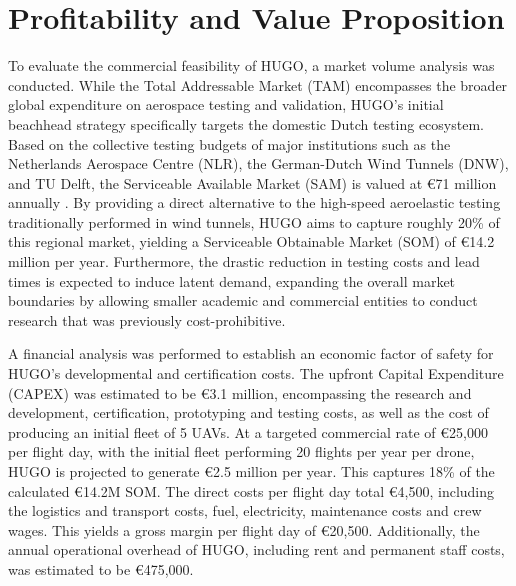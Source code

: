 


\section*{Profitability and Value Proposition}
\label{sec:exec-objective_and_value_poposition}

To evaluate the commercial feasibility of HUGO, a market volume analysis was conducted. While the Total Addressable Market (TAM) encompasses the broader global expenditure on aerospace testing and validation, HUGO's initial beachhead strategy specifically targets the domestic Dutch testing ecosystem. Based on the collective testing budgets of major institutions such as the Netherlands Aerospace Centre (NLR), the German-Dutch Wind Tunnels (DNW), and TU Delft, the Serviceable Available Market (SAM) is valued at €71 million annually . By providing a direct alternative to the high-speed aeroelastic testing traditionally performed in wind tunnels, HUGO aims to capture roughly 20\%  of this regional market, yielding a Serviceable Obtainable Market (SOM) of €14.2 million per year. Furthermore, the drastic reduction in testing costs and lead times is expected to induce latent demand, expanding the overall market boundaries by allowing smaller academic and commercial entities to conduct research that was previously cost-prohibitive.

A financial analysis was performed to establish an economic factor of safety for HUGO's developmental and certification costs. The upfront Capital Expenditure (CAPEX) was estimated to be €3.1 million, encompassing the research and development, certification, prototyping and testing costs, as well as the cost of producing an initial fleet of 5 UAVs. At a targeted commercial rate of €25,000 per flight day, with the initial fleet performing 20 flights per year per drone, HUGO is projected to generate €2.5 million per year. This captures 18\% of the calculated €14.2M SOM. The direct costs per flight day total €4,500, including the logistics and transport costs, fuel, electricity, maintenance costs and crew wages. This yields a gross margin per flight day of €20,500. Additionally, the annual operational overhead of HUGO, including rent and permanent staff costs, was estimated to be €475,000.

